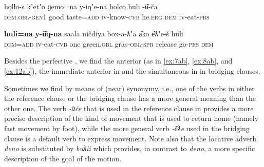 \documentclass[output=paper]{LSP/langsci}
\begin{document}
\clearpage
\begin{exe}
	\ex	\label{ex:13ab} 
	\begin{xlist}
		\ex	\label{ex:13a}
		\gll	holɬo-s     		kʼetʼo 	ɡemo=na   	y-iqʼe-na  			\underline{holco}  	\underline{huli}   \underline{-ü͂-ča}\\
			\textsc{dem.obl-gen1} 	good     taste=\textsc{add}  	\textsc{iv}-know-\textsc{cvb} 	he.\textsc{erg}	\textsc{dem} 	\textsc{iv}-eat-\textsc{prs}\\
		\glt	{}

		\ex	\label{ex:13b}
		\gll			\textbf{huli=na}   	\textbf{y-ü͂q-na}  	saala 	ničdiya 		box-a-ƛʼa 		a͂ko e͂ƛʼe-š 	huli \\
			\textsc{dem=add}  	\textsc{iv}-eat-\textsc{cvb} 	one   	green.\textsc{obl} 	gras-\textsc{obl-spr} 	release go-\textsc{prs} 	\textsc{dem}  \\
		\glt	{}
	\end{xlist}
\end{exe}

Besides the perfective , we find the anterior  (as in \ref{ex:7ab}, \ref{ex:8ab}, and \ref{ex:12ab}), the immediate anterior  in  and the simultaneous  in  in bridging clauses. 

Sometimes we find  by means of (near) synonymy, i.e., one of the verbs in either the reference clause or the bridging clause has a more general meaning than the other one. The verb \textit{-u͂če}  that is used in the reference clause in  provides a more precise description  of the kind of movement that is used to return home (namely fast movement by foot), while the more general verb  \textit{-e͂ƛe}  used in the bridging clause is a default verb to express movement. Note also that the locative adverb \textit{deno}  is substituted by \textit{buƛii}  which provides, in contrast to \textit{deno}, a more specific description of the goal of the motion. 
\end{document}
